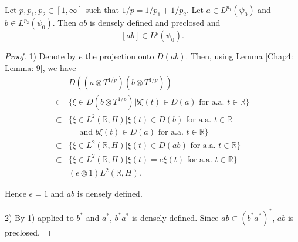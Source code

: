 \begin{lemma}
    Let $p,p_1,p_2\in [1,\infty]$ such that $1/p = 1/p_1 + 1/p_2$. Let $a\in L^{p_1}(\psi_0)$ and $b \in L^{p_2}(\psi_0)$. Then $ab$ is densely defined and preclosed and
    \[
        [ab]\in L^p(\psi_0).
    \]
\end{lemma}
\begin{proof}
    1) Denote by $e$ the projection onto $D(ab)$. Then, using Lemma \ref{Chap4: Lemma: 9}, we have
    \[
        \begin{split}
            &D((a\otimes T^{1/p})(b\otimes T^{1/p}))\\
            \subset& \{\xi\in D(b\otimes T^{1/p})|b\xi(t)\in D(a) \text{ for a.a. }t\in \mathbb{R}\}\\
            \subset& \{\xi\in L^2(\mathbb{R},H)|\xi(t)\in D(b) \text{ for a.a. }t\in \mathbb{R}\\
            &\quad \text{ and } b\xi(t)\in D(a) \text{ for a.a. }t\in \mathbb{R}\}\\
            \subset& \{\xi\in L^2(\mathbb{R},H)|\xi(t)\in D(ab) \text{ for a.a. }t\in \mathbb{R}\}\\
            \subset& \{\xi\in L^2(\mathbb{R},H)|\xi(t)=e\xi(t) \text{ for a.a. }t\in \mathbb{R}\}\\
            =&(e\otimes 1)L^2(\mathbb{R},H).
        \end{split}
    \]

    Hence $e = 1$ and $ab$ is densely defined. \par
    2) By 1) applied to $b^*$ and $a^*$, $b^*a^*$ is densely defined. Since $ab\subset (b^*a^*)^*$, $ab$ is preclosed.
\end{proof}
% 